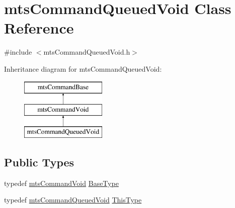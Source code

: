 \hypertarget{classmts_command_queued_void}{}\section{mts\+Command\+Queued\+Void Class Reference}
\label{classmts_command_queued_void}


{\ttfamily \#include $<$mts\+Command\+Queued\+Void.\+h$>$}

Inheritance diagram for mts\+Command\+Queued\+Void\+:\begin{figure}[H]
\begin{center}
\leavevmode
\includegraphics[height=3.000000cm]{d3/d05/classmts_command_queued_void}
\end{center}
\end{figure}
\subsection*{Public Types}
\begin{DoxyCompactItemize}
\item 
typedef \hyperlink{classmts_command_void}{mts\+Command\+Void} \hyperlink{classmts_command_queued_void_a5e83cb9e30b4d01f5e133d2e809a7379}{Base\+Type}
\item 
typedef \hyperlink{classmts_command_queued_void}{mts\+Command\+Queued\+Void} \hyperlink{classmts_command_queued_void_a2bce402cdb87e0eeff9903a19a48b630}{This\+Type}
\end{DoxyCompactItemize}
